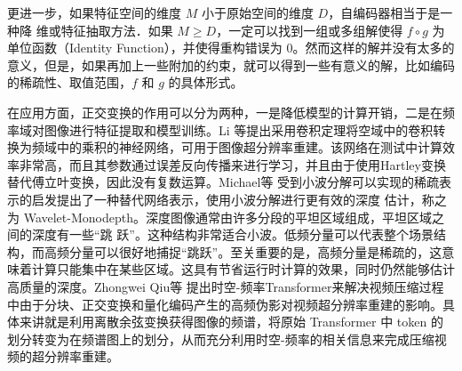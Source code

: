 更进一步，如果特征空间的维度 $M$ 小于原始空间的维度 $D$，自编码器相当于是一种降 维或特征抽取方法．如果 $M \geq D$，一定可以找到一组或多组解使得 $f \circ g$ 为单位函数（Identity Function），并使得重构错误为 0。然而这样的解并没有太多的意义，但是，如果再加上一些附加的约束，就可以得到一些有意义的解，比如编码 的稀疏性、取值范围，$f$ 和 $g$ 的具体形式。

在应用方面，正交变换的作用可以分为两种，一是降低模型的计算开销，二是在频率域对图像进行特征提取和模型训练。Li \cite{DBLP:conf/ijcnn/LiYR18} 等提出采用卷积定理将空域中的卷积转换为频域中的乘积的神经网络，可用于图像超分辨率重建。该网络在测试中计算效率非常高，而且其参数通过误差反向传播来进行学习，并且由于使用Hartley变换替代傅立叶变换，因此没有复数运算。Michael等 \cite{DBLP:conf/cvpr/RamamonjisoaFWL21} 受到小波分解可以实现的稀疏表示的启发提出了一种替代网络表示，使用小波分解进行更有效的深度 估计，称之为 Wavelet-Monodepth。深度图像通常由许多分段的平坦区域组成，平坦区域之间的深度有一些“跳 跃”。这种结构非常适合小波。低频分量可以代表整个场景结构，而高频分量可以很好地捕捉“跳跃”。至关重要的是，高频分量是稀疏的，这意味着计算只能集中在某些区域。这具有节省运行时计算的效果，同时仍然能够估计高质量的深度。Zhongwei Qiu等 \cite{DBLP:conf/eccv/QiuYFF22} 提出时空-频率Transformer来解决视频压缩过程中由于分块、正交变换和量化编码产生的高频伪影对视频超分辨率重建的影响。具体来讲就是利用离散余弦变换获得图像的频谱，将原始 Transformer 中 token 的划分转变为在频谱图上的划分，从而充分利用时空-频率的相关信息来完成压缩视频的超分辨率重建。


